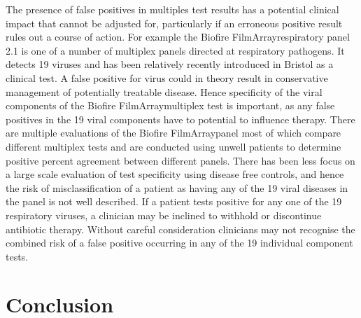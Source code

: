 \documentclass[10pt,letterpaper]{article}
\begin{document}
The presence of false positives in multiples test results has a potential clinical impact that cannot be adjusted for, particularly if an erroneous positive result rules out a course of action. For example the Biofire FilmArray\texttrademark respiratory panel 2.1 is one of a number of multiplex panels directed at respiratory pathogens\cite{ramanan2017}. It detects 19 viruses\cite{chang2022,loeffelholz2020} and has been relatively recently introduced in Bristol as a clinical test. A false positive for virus could in theory result in conservative management of potentially treatable disease. Hence specificity of the viral components of the Biofire FilmArray\texttrademark multiplex test is important, as any false positives in the 19 viral components have to potential to influence therapy. There are multiple evaluations of the Biofire FilmArray\texttrademark panel\cite{popowitch2020,murphy2020,loeffelholz2020,leber2018,babady2013,chan2018} most of which compare different multiplex tests and are conducted using unwell patients to determine positive percent agreement between different panels. There has been less focus on a large scale evaluation of test specificity using disease free controls, and hence the risk of misclassification of a patient as having any of the 19 viral diseases in the panel is not well described. If a patient tests positive for any one of the 19 respiratory viruses, a clinician may be inclined to withhold or discontinue antibiotic therapy. Without careful consideration clinicians may not recognise the combined risk of a false positive occurring in any of the 19 individual component tests.

\section*{Conclusion}
\end{document}
